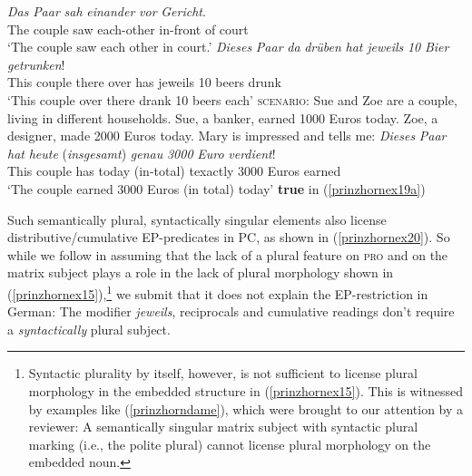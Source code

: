 \documentclass[output=paper,colorlinks,citecolor=brown,
]{langscibook}
\begin{document}
\ea \label{prinzhornex18} 
\ea 
\gll \textit{Das} \textit{Paar} \textit{sah} \textit{einander} \textit{vor} \textit{Gericht}.\\
  The couple saw each-other in-front of  court \\
\glt `The couple saw each other in court.' \label{prinzhornex18a}
\ex   \gll \textit{Dieses} \textit{Paar} \textit{da} \textit{drüben} \textit{hat} \textit{jeweils} \textit{10} \textit{Bier} \textit{getrunken}! \\
  This couple there over has jeweils 10 beers drunk\\
\glt `This couple over there drank 10 beers each'  \label{prinzhornex18b}
\ex  \textsc{scenario:} Sue and Zoe are a couple, living in different households. Sue, a banker, earned 1000 Euros today. Zoe, a designer, made 2000 Euros today. Mary is impressed and tells me: \label{prinzhornex19a}
\ex \gll \textit{Dieses} \textit{Paar} \textit{hat} \textit{heute} (\textit{insgesamt}) \textit{genau} \textit{3000} \textit{Euro} \textit{verdient}!\\
This couple has today (in-total) texactly 3000 Euros earned \\
\glt `The couple earned 3000 Euros (in total) today' \label{prinzhornex19b}\phantom{.}\hfill \textbf{true} in (\ref{prinzhornex19a})
\z\z

Such semantically plural, syntactically singular elements also license distributive/cumulative EP-predicates in PC, as shown in (\ref{prinzhornex20}). So while we follow \cite{Landau:2000} in assuming that the lack of a plural feature on \textsc{pro} and  on the matrix subject plays a role in the lack of plural morphology shown in (\ref{prinzhornex15}),\footnote{Syntactic plurality by itself, however, is not sufficient to license plural morphology in the embedded structure in (\ref{prinzhornex15}). This is witnessed by examples like (\ref{prinzhorndame}), which were brought to our attention by a reviewer: A  semantically singular matrix subject with syntactic plural marking (i.e., the polite plural) cannot license plural morphology on the embedded noun.


\z

} we submit that it does not explain the EP-restriction in German: The modifier {\it jeweils}, reciprocals and cumulative readings don't require a \textit{syntactically} plural subject.
\end{document}
